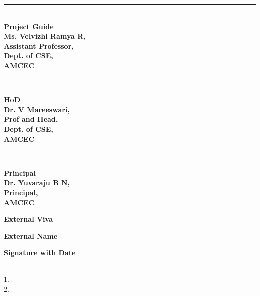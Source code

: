 \documentclass[a4paper, 12pt]{report}
\begin{document}
\vspace{0.8cm}
\noindent
\begin{minipage}[t]{0.32\textwidth}
    \singlespacing
    \centering
    \rule{0.8\linewidth}{0.4pt}\\
    \textbf{Project Guide\\Ms. Velvizhi Ramya R,\\Assistant Professor,\\Dept. of CSE,\\AMCEC}
\end{minipage}
\hfill
\begin{minipage}[t]{0.32\textwidth}
    \singlespacing
    \centering
    \rule{0.8\linewidth}{0.4pt}\\
    \textbf{HoD\\Dr. V Mareeswari,\\Prof and Head,\\Dept. of CSE,\\AMCEC}
\end{minipage}
\hfill
\begin{minipage}[t]{0.32\textwidth}
    \singlespacing
    \centering
    \rule{0.8\linewidth}{0.4pt}\\
    \textbf{Principal\\Dr. Yuvaraju B N,\\Principal,\\AMCEC}
\end{minipage}

\begin{center}
    {\textbf{External Viva}}
\end{center}
\begin{minipage}[t]{0.32\textwidth}
    \centering  
    \textbf{External Name}
\end{minipage}
\hfill
\begin{minipage}[t]{0.32\textwidth}
    \centering
    \textbf{Signature with Date}
\end{minipage}\\[0.2cm]
\begingroup
{}
\vspace{-0.26cm}
1.\\
2.
\endgroup

\vspace{1.0cm}
\doublespacing


\titlespacing*{\chapter}{0pt}{20pt}{10pt}
\setlength{\parindent}{0pt}
\doublespacing
\end{document}

